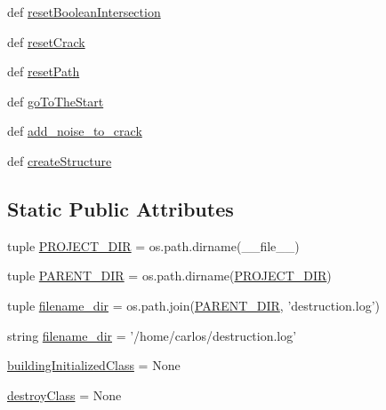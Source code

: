 \begin{DoxyCompactItemize}
\item 
def \hyperlink{classlib_1_1destruction_session_1_1destruction_session_a444f2ce0fff7d744bd5137c9d20fd16d}{reset\-Boolean\-Intersection}
\item 
def \hyperlink{classlib_1_1destruction_session_1_1destruction_session_a1fa7686667a8f21719d65cb57ef72600}{reset\-Crack}
\item 
def \hyperlink{classlib_1_1destruction_session_1_1destruction_session_a95e523a0b4bbfa6733811a339d0c7b12}{reset\-Path}
\item 
def \hyperlink{classlib_1_1destruction_session_1_1destruction_session_ac4de601b636fd22b0b7a0b76ec8ebf2f}{go\-To\-The\-Start}
\item 
def \hyperlink{classlib_1_1destruction_session_1_1destruction_session_a4178a0ae633a75d99f9afa86a84e15a7}{add\-\_\-noise\-\_\-to\-\_\-crack}
\item 
def \hyperlink{classlib_1_1destruction_session_1_1destruction_session_a26e5e509e4b52b853fdb0710e1012f15}{create\-Structure}
\end{DoxyCompactItemize}
\subsection*{Static Public Attributes}
\begin{DoxyCompactItemize}
\item 
tuple \hyperlink{classlib_1_1destruction_session_1_1destruction_session_acf74736c3cfa06e4d607b7b6ca585349}{P\-R\-O\-J\-E\-C\-T\-\_\-\-D\-I\-R} = os.\-path.\-dirname(\-\_\-\-\_\-file\-\_\-\-\_\-)
\item 
tuple \hyperlink{classlib_1_1destruction_session_1_1destruction_session_a621b27bfbd63b05ee643340723f3ebbb}{P\-A\-R\-E\-N\-T\-\_\-\-D\-I\-R} = os.\-path.\-dirname(\hyperlink{classlib_1_1destruction_session_1_1destruction_session_acf74736c3cfa06e4d607b7b6ca585349}{P\-R\-O\-J\-E\-C\-T\-\_\-\-D\-I\-R})
\item 
tuple \hyperlink{classlib_1_1destruction_session_1_1destruction_session_a76eb42cb9660b5a63763697caf1a9056}{filename\-\_\-dir} = os.\-path.\-join(\hyperlink{classlib_1_1destruction_session_1_1destruction_session_a621b27bfbd63b05ee643340723f3ebbb}{P\-A\-R\-E\-N\-T\-\_\-\-D\-I\-R}, 'destruction.\-log')
\item 
string \hyperlink{classlib_1_1destruction_session_1_1destruction_session_a535c5aa6dfd129bd730bf9f653496dea}{filename\-\_\-dir} = '/home/carlos/destruction.\-log'
\item 
\hyperlink{classlib_1_1destruction_session_1_1destruction_session_ac47bb67b70ee1ec78bca791e212bf54e}{building\-Initialized\-Class} = None
\item 
\hyperlink{classlib_1_1destruction_session_1_1destruction_session_a74dd78c0280731845e4bdf11bb5f5b8a}{destroy\-Class} = None
\end{DoxyCompactItemize}


